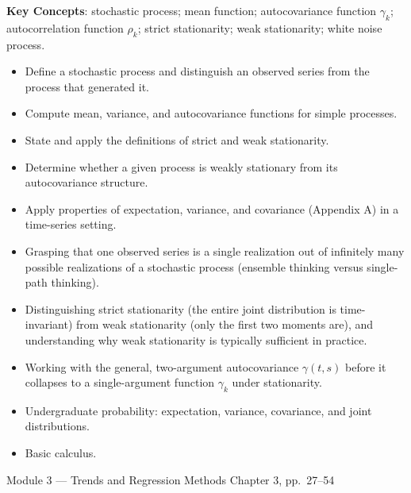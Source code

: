 \documentclass[11pt]{article}
\newcommand{\keyconcepts}{\textbf{\color{modblue}Key Concepts}}
\begin{document}
\keyconcepts: stochastic process; mean function; autocovariance function $\gamma_k$; autocorrelation function $\rho_k$; strict stationarity; weak stationarity; white noise process.

\begin{objectives}
\begin{itemize}
  \item Define a stochastic process and distinguish an observed series from the process that generated it.
  \item Compute mean, variance, and autocovariance functions for simple processes.
  \item State and apply the definitions of strict and weak stationarity.
  \item Determine whether a given process is weakly stationary from its autocovariance structure.
  \item Apply properties of expectation, variance, and covariance (Appendix A) in a time-series setting.
\end{itemize}
\end{objectives}

\begin{difficult}
\begin{itemize}
  \item Grasping that one observed series is a single realization out of infinitely many possible realizations of a stochastic process (ensemble thinking versus single-path thinking).
  \item Distinguishing strict stationarity (the entire joint distribution is time-invariant) from weak stationarity (only the first two moments are), and understanding why weak stationarity is typically sufficient in practice.
  \item Working with the general, two-argument autocovariance $\gamma(t,s)$ before it collapses to a single-argument function $\gamma_k$ under stationarity.
\end{itemize}
\end{difficult}

\begin{prereqs}
\begin{itemize}
  \item Undergraduate probability: expectation, variance, covariance, and joint distributions.
  \item Basic calculus.
\end{itemize}
\end{prereqs}

\vspace{6pt}
\begin{moduletitle}{Module 3 --- Trends and Regression Methods}
\small Chapter 3, pp.\ 27--54
\end{moduletitle}
\end{document}
